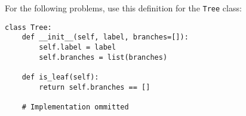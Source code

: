 For the following problems, use this definition for the \lstinline{Tree} class:
\begin{lstlisting}
class Tree:
    def __init__(self, label, branches=[]):
        self.label = label
        self.branches = list(branches)

    def is_leaf(self):
        return self.branches == []

    # Implementation ommitted
\end{lstlisting}



